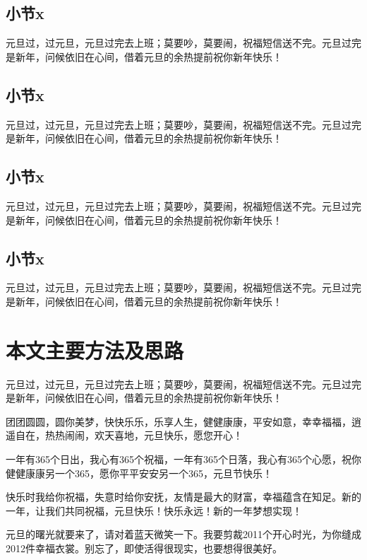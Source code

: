 \subsection{小节x}

元旦过，过元旦，元旦过完去上班；莫要吵，莫要闹，祝福短信送不完。元旦过完是新年，问候依旧在心间，借着元旦的余热提前祝你新年快乐！

\subsection{小节x}

元旦过，过元旦，元旦过完去上班；莫要吵，莫要闹，祝福短信送不完。元旦过完是新年，问候依旧在心间，借着元旦的余热提前祝你新年快乐！

\subsection{小节x}

元旦过，过元旦，元旦过完去上班；莫要吵，莫要闹，祝福短信送不完。元旦过完是新年，问候依旧在心间，借着元旦的余热提前祝你新年快乐！

\subsection{小节x}

元旦过，过元旦，元旦过完去上班；莫要吵，莫要闹，祝福短信送不完。元旦过完是新年，问候依旧在心间，借着元旦的余热提前祝你新年快乐！


\section{本文主要方法及思路}

元旦过，过元旦，元旦过完去上班；莫要吵，莫要闹，祝福短信送不完。元旦过完是新年，问候依旧在心间，借着元旦的余热提前祝你新年快乐！

团团圆圆，圆你美梦，快快乐乐，乐享人生，健健康康，平安如意，幸幸福福，逍遥自在，热热闹闹，欢天喜地，元旦快乐，愿您开心！

一年有365个日出，我心有365个祝福，一年有365个日落，我心有365个心愿，祝你健健康康另一个365，愿你平平安安另一个365，元旦节快乐！

快乐时我给你祝福，失意时给你安抚，友情是最大的财富，幸福蕴含在知足。新的一年，让我们共同祝福，元旦快乐！快乐永远！新的一年梦想实现！

元旦的曙光就要来了，请对着蓝天微笑一下。我要剪裁2011个开心时光，为你缝成2012件幸福衣裳。别忘了，即使活得很现实，也要想得很美好。


